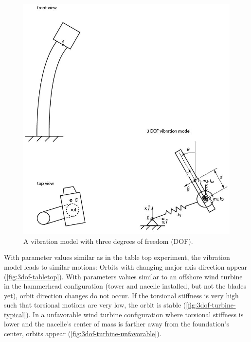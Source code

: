 \documentclass{article}
\begin{document}
\begin{figure}
    \centering
    \includegraphics{figures/vibration_model.jpg}
    \caption{A vibration model with three degrees of freedom (DOF).}
    \label{fig:3dof-system}
\end{figure}

With parameter values similar as in the table top experiment, the vibration model leads to similar motions: Orbits with changing major axis direction appear (\autoref{fig:3dof-tabletop}). With parameters values similar to an offshore wind turbine in the hammerhead configuration (tower and nacelle installed, but not the blades yet), orbit direction changes do not occur. If the torsional stiffness is very high such that torsional motions are very low, the orbit is stable (\autoref{fig:3dof-turbine-typical}). In a unfavorable wind turbine configuration where torsional stiffness is lower and the nacelle's center of mass is farther away from the foundation's center, orbits appear (\autoref{fig:3dof-turbine-unfavorable}).
\end{document}
